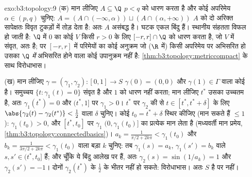 \begin{solution}{exo:b3:topology:9}
(क) मान लीजिए $A \subseteq \Q$ $p < q$ को धारण करता है और कोई अपरिमेय $\alpha \in (p, q)$
चुनिए: $A = (A \cap (-\infty, \alpha)) \sqcup
(A\cap(\alpha, +\infty))$ $A$ को दो अरिक्त सापेक्षतः विवृत टुकड़ों में तोड़ देता
है: अतः $A$ असंबद्ध है। घटक एकल बिंदु हैं। स्थानीय संहतता विफल
हो जाती है: $\Q$ में $0$ का कोई   $V$ किसी $r > 0$
के लिए $[-r, r]\cap\Q$ को धारण करता है, जो $V$ में संवृत, अतः  है; पर
$[-r,r]$ में परिमेयों का कोई अनुक्रम जो ($\R$ में) किसी अपरिमेय पर
अभिसरित हो उसका \emph{$\Q$ में} अभिसरित होने वाला कोई उपानुक्रम
नहीं है: \cref{thm:b3:topology:metriccompact} के साथ विरोधाभास।

(ख) मान लीजिए $\gamma = (\gamma_1, \gamma_2) \colon [0,1] \to S$ $\gamma(0) = (0,0)$ और $\gamma(1) \in \Gamma$ वाला कोई  है। समुच्चय $\{t : \gamma_1(t) = 0\}$
संवृत है और $1$ को धारण नहीं करता; मान लीजिए $t^*$ उसका उच्चतम
है, अतः $\gamma_1(t^*) = 0$ और $(t^*, 1]$ पर $\gamma_1 > 0$। $t^*$ पर $\gamma_2$ की  से $t \in [t^*, t^* + \delta]$
के लिए $\abs{\gamma_2(t) -
\gamma_2(t^*)} < \tfrac12$ वाला $\delta$ चुनिए। कोई $t_0 = t^* + \delta$ स्थिर कीजिए (मान सकते हैं
$\leq 1$): $\gamma_1(t_0) > 0$, और $[t^*, t_0]$ पर $\gamma_1$ $(0, \gamma_1(t_0)]$ का प्रत्येक मान लेता है
(मध्यवर्ती मान प्रमेय, \cref{thm:b3:topology:connectedbasics})। $a_k = \frac1{\pi/2 + 2k\pi} < \gamma_1(t_0)$ और $b_k =
\frac1{3\pi/2 + 2k\pi} < \gamma_1(t_0)$ वाला बड़ा $k$ चुनिए:
तब $\gamma_1(s) = a_k$, $\gamma_1(s') = b_k$ वाले $s, s' \in
(t^*, t_0]$ हैं; और चूँकि ये बिंदु आलेख पर हैं, अतः
$\gamma_2(s) = \sin(1/a_k) =
1$ और $\gamma_2(s') = -1$। दोनों $\gamma_2(t^*)$ के $\frac12$ के भीतर नहीं हो सकते: विरोधाभास।
अतः $S$  है पर  नहीं।
\end{solution}

